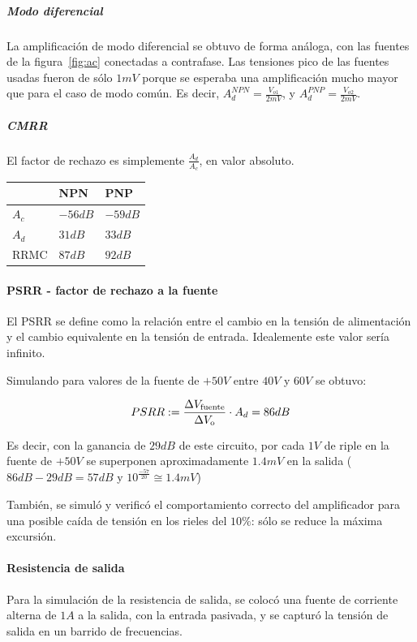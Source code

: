 \documentclass[a4paper,12pt,twoside]{article}
\begin{document}
\subparagraph{Modo diferencial}

La amplificación de modo diferencial se obtuvo de forma análoga, con las fuentes de la figura~\ref{fig:ac} conectadas a contrafase. Las tensiones pico de las fuentes usadas fueron de sólo $1mV$ porque se esperaba una amplificación mucho mayor que para el caso de modo común. Es decir, $A_d^{NPN}=\frac{V_{o1}}{2mV}$, y $A_d^{PNP}=\frac{V_{o2}}{2mV}$.

\subparagraph{CMRR} El factor de rechazo es simplemente $\frac{A_d}{A_c}$, en valor absoluto.


\begin{table}[H]
\centering
\begin{tabular}{l|ll}
 & NPN & PNP \\ \hline
$A_c$ & $-56dB$ & $-59dB$  \\
$A_d$ & $31dB$ & $33dB$  \\
RRMC & $87dB$ & $92dB$  
\end{tabular}
\end{table}

\paragraph{PSRR - factor de rechazo a la fuente}

El PSRR se define como la relación entre el cambio en la tensión de alimentación y el cambio equivalente en la tensión de entrada. Idealemente este valor sería infinito.

Simulando para valores de la fuente de $+50V$ entre $40V$ y $60V$ se obtuvo:

\[ PSRR := {\Delta V_\mathrm{fuente} \over {\Delta V_\mathrm{o}}} \cdot A_d = 86dB \]



Es decir, con la ganancia de $29dB$ de este circuito, por cada $1V$ de riple en la fuente de $+50V$ se superponen aproximadamente $1.4mV$ en la salida ($86dB-29dB=57dB$ y $10^\frac{-57}{20} \cong 1.4mV $)

También, se simuló y verificó el comportamiento correcto del amplificador para una posible caída de tensión en los rieles del $10\%$: sólo se reduce la máxima excursión.

\paragraph{Resistencia de salida}  

Para la simulación de la resistencia de salida, se colocó una fuente de corriente alterna de $1A$ a la salida, con la entrada pasivada, y se capturó la tensión de salida en un barrido de frecuencias.
\end{document}
